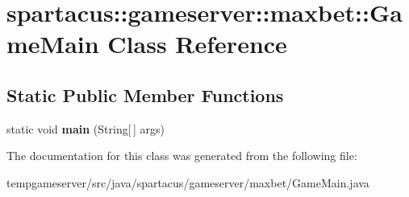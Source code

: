 \hypertarget{classspartacus_1_1gameserver_1_1maxbet_1_1GameMain2}{
\section{\-s\-p\-a\-r\-t\-a\-c\-u\-s\-:\-:\-g\-a\-m\-e\-s\-e\-r\-v\-e\-r\-:\-:\-m\-a\-x\-b\-e\-t\-:\-:\-G\-a\-m\-e\-M\-a\-i\-n \-C\-l\-a\-s\-s \-R\-e\-f\-e\-r\-e\-n\-c\-e}
\label{classspartacus_1_1gameserver_1_1maxbet_1_1GameMain2}
}
\subsection*{Static Public Member Functions}
\begin{DoxyCompactItemize}
\item 
\hypertarget{classspartacus_1_1gameserver_1_1maxbet_1_1GameMain2_a82b926dcaa7255fbe54125952cae3536}{
\-s\-t\-a\-t\-i\-c \-v\-o\-i\-d {\bfseries \-m\-a\-i\-n} \-(\-S\-t\-r\-i\-n\-g\mbox{[}$\,$\mbox{]} \-a\-r\-g\-s\-)}
\label{classspartacus_1_1gameserver_1_1maxbet_1_1GameMain2_a82b926dcaa7255fbe54125952cae3536}

\end{DoxyCompactItemize}


The documentation for this class was generated from the following file:\begin{DoxyCompactItemize}
\item 
\-t\-e\-m\-p\-g\-a\-m\-e\-s\-e\-r\-v\-e\-r\-/\-s\-r\-c\-/\-j\-a\-v\-a\-/\-s\-p\-a\-r\-t\-a\-c\-u\-s\-/\-g\-a\-m\-e\-s\-e\-r\-v\-e\-r\-/\-m\-a\-x\-b\-e\-t\-/\-G\-a\-m\-e\-M\-a\-i\-n\-.\-j\-a\-v\-a\end{DoxyCompactItemize}
